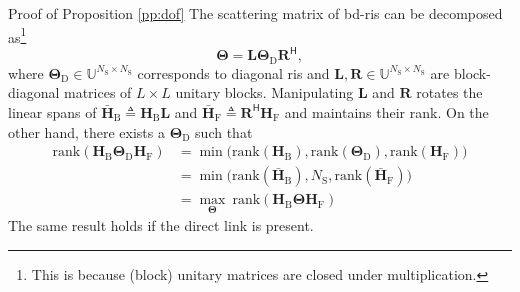 \documentclass[journal]{IEEEtran}
\begin{document}
\begin{appendix}
	\begin{subsection}{Proof of Proposition \ref{pp:dof}}\label{ap:dof}
		The scattering matrix of \gls{bd}-\gls{ris} can be decomposed as\footnote{This is because (block) unitary matrices are closed under multiplication.}
		\begin{equation}
			\mathbf{\Theta} = \mathbf{L} \mathbf{\Theta}_\mathrm{D} \mathbf{R}^\mathsf{H},
		\end{equation}
		where $\mathbf{\Theta}_\mathrm{D} \in \mathbb{U}^{N_\mathrm{S} \times N_\mathrm{S}}$ corresponds to diagonal \gls{ris} and $\mathbf{L}, \mathbf{R} \in \mathbb{U}^{N_\mathrm{S} \times N_\mathrm{S}}$ are block-diagonal matrices of $L \times L$ unitary blocks.
		Manipulating $\mathbf{L}$ and $\mathbf{R}$ rotates the linear spans of $\bar{\mathbf{H}}_\mathrm{B} \triangleq \mathbf{H}_\mathrm{B} \mathbf{L}$ and $\bar{\mathbf{H}}_\mathrm{F} \triangleq \mathbf{R}^\mathsf{H} \mathbf{H}_\mathrm{F}$ and maintains their rank.
		On the other hand, there exists a $\mathbf{\Theta}_\mathrm{D}$ such that
		\begin{equation*}
			\begin{split}
				\mathrm{rank}(\mathbf{H}_\mathrm{B} \mathbf{\Theta}_\mathrm{D} \mathbf{H}_\mathrm{F})
				& = \min \bigl( \mathrm{rank}(\mathbf{H}_\mathrm{B}), \mathrm{rank}(\mathbf{\Theta}_\mathrm{D}), \mathrm{rank}(\mathbf{H}_\mathrm{F}) \bigr) \\
				& = \min \bigl( \mathrm{rank}(\bar{\mathbf{H}}_\mathrm{B}), N_\mathrm{S}, \mathrm{rank}(\bar{\mathbf{H}}_\mathrm{F}) \bigr) \\
				& = \max_\mathbf{\Theta} \ \mathrm{rank}(\mathbf{H}_\mathrm{B} \mathbf{\Theta} \mathbf{H}_\mathrm{F})
			\end{split}
		\end{equation*}
		The same result holds if the direct link is present.
	\end{subsection}


\end{appendix}
\end{document}
